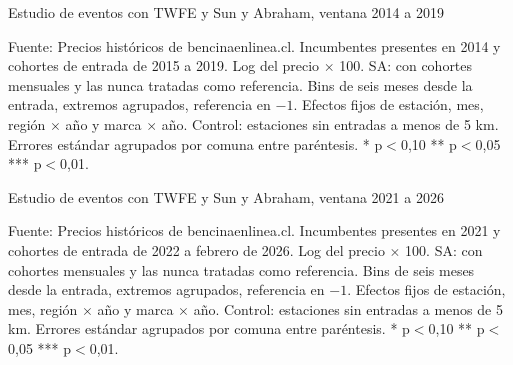 \begin{table}[htbp]
    \centering
    \caption{Estudio de eventos con TWFE y Sun y Abraham, ventana 2014 a 2019} \label{tab:ventana_2014_2019}
    \ajustar{}
    \caption*{\footnotesize Fuente: Precios históricos de bencinaenlinea.cl. Incumbentes presentes en 2014 y cohortes de entrada de 2015 a 2019. Log del precio $\times$ 100. SA: \textcite{SUNABRAHAM2021} con cohortes mensuales y las nunca tratadas como referencia. Bins de seis meses desde la entrada, extremos agrupados, referencia en $-1$. Efectos fijos de estación, mes, región $\times$ año y marca $\times$ año. Control: estaciones sin entradas a menos de 5 km. Errores estándar agrupados por comuna entre paréntesis. * p$<$0,10 ** p$<$0,05 *** p$<$0,01.}
\end{table}

\begin{table}[htbp]
    \centering
    \caption{Estudio de eventos con TWFE y Sun y Abraham, ventana 2021 a 2026} \label{tab:ventana_2021_2026}
    \ajustar{}
    \caption*{\footnotesize Fuente: Precios históricos de bencinaenlinea.cl. Incumbentes presentes en 2021 y cohortes de entrada de 2022 a febrero de 2026. Log del precio $\times$ 100. SA: \textcite{SUNABRAHAM2021} con cohortes mensuales y las nunca tratadas como referencia. Bins de seis meses desde la entrada, extremos agrupados, referencia en $-1$. Efectos fijos de estación, mes, región $\times$ año y marca $\times$ año. Control: estaciones sin entradas a menos de 5 km. Errores estándar agrupados por comuna entre paréntesis. * p$<$0,10 ** p$<$0,05 *** p$<$0,01.}
\end{table}


